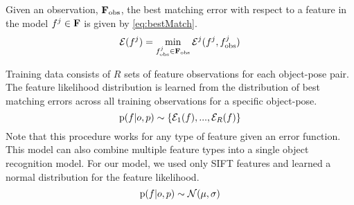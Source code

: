 


        Given an observation, $\mathbf{F}_{\text{obs}}$, the best matching error with respect to a feature in the model $f^j \in \mathbf{F}$ is given by \eqref{eq:bestMatch}.
        \begin{equation}
            \label{eq:bestMatch}
            \cursive{E}(f^j) = \min_{f^j_{\text{obs}} \in \set{F}_{\text{obs}}}\cursive{E}^j(f^j,f^j_{\text{obs}})
        \end{equation}
        
        Training data consists of $R$ sets of feature observations for each object-pose pair. The feature likelihood distribution is learned from the distribution of best matching errors across all training observations for a specific object-pose.
        \begin{equation}
            \text{p}(f|o,p) \sim \{\mathcal{E}_1(f), ...,  \mathcal{E}_R(f)\}
        \end{equation}
        Note that this procedure works for any type of feature given an error function. This model can also combine multiple feature types into a single object recognition model. For our model, we used only SIFT features and learned a normal distribution for the feature likelihood.   
        \begin{equation}
            \text{p}(f|o,p) \sim \mathcal{N}(\mu,\sigma)
        \end{equation}
        
